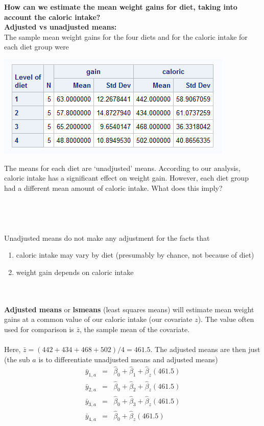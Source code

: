 \newpage

\textbf{How can we estimate the mean weight gains for diet, taking into account the caloric intake?}\\
\textbf{Adjusted vs unadjusted means:}\\
The sample mean weight gains for the four diets and for the caloric intake for each diet group were
\begin{center}
\includegraphics{DietsMeans}
\end{center}

The means for each diet are `unadjusted' means.  According to our analysis, caloric intake has a significant effect on weight gain.  However, each diet group had a different mean amount of caloric intake.  What does this imply?\\~\\~\\~\\~\\

Unadjusted means do not make any adjustment for the facts that 
\begin{enumerate}
\item caloric intake may vary by diet (presumably by chance, not because of diet)
\item weight gain depends on caloric intake
\end{enumerate}
~\\~\\
\textbf{Adjusted means} or \textbf{lsmeans} (least squares means) will estimate mean weight gains at a common value of our caloric intake (our covariate $z$).  The value often used for comparison is $\bar{z}$, the sample mean of the covariate.\\~\\

Here, $\bar{z}= (442+434+468+502)/4 = 461.5$.  The adjusted means are then just (the sub $a$ is to differentiate unadjusted means and adjusted means)
\begin{eqnarray*}
\bar{y}_{1,a} & = & \hat\beta_0 + \hat\beta_1 + \hat\beta_z (461.5) \\
\bar{y}_{2,a} & = & \hat\beta_0 + \hat\beta_2 + \hat\beta_z (461.5) \\
\bar{y}_{3,a} & = & \hat\beta_0 + \hat\beta_3 + \hat\beta_z (461.5) \\
\bar{y}_{4,a} & = & \hat\beta_0 + \hat\beta_z (461.5)
\end{eqnarray*} 

